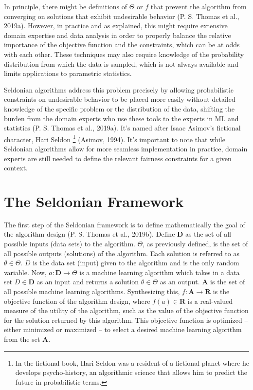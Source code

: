 \documentclass[12pt, twoside]{amherstthesis}
\begin{document}
In principle, there might be definitions of \(\Theta\) or \(f\) that prevent the algorithm from converging on solutions that exhibit undesirable behavior (P. S. Thomas et al., 2019a). However, in practice and as explained, this might require extensive domain expertise and data analysis in order to properly balance the relative importance of the objective function and the constraints, which can be at odds with each other. These techniques may also require knowledge of the probability distribution from which the data is sampled, which is not always available and limits applications to parametric statistics.

Seldonian algorithms address this problem precisely by allowing probabilistic constraints on undesirable behavior to be placed more easily without detailed knowledge of the specific problem or the distribution of the data, shifting the burden from the domain experts who use these tools to the experts in ML and statistics (P. S. Thomas et al., 2019a). It's named after Isaac Asimov's fictional character, Hari Seldon \footnote{In the fictional book, Hari Seldon was a resident of a fictional planet where he develops psycho-history, an algorithmic science that allows him to predict the future in probabilistic terms.} (Asimov, 1994). It's important to note that while Seldonian algorithms allow for more seamless implementation in practice, domain experts are still needed to define the relevant fairness constraints for a given context.

\hypertarget{seldonian}{%
\section{The Seldonian Framework}\label{seldonian}}

The first step of the Seldonian framework is to define mathematically the goal of the algorithm design (P. S. Thomas et al., 2019b). Define \(\textbf{D}\) as the set of all possible inputs (data sets) to the algorithm. \(\Theta\), as previously defined, is the set of all possible outputs (solutions) of the algorithm. Each solution is referred to as \(\theta \in \Theta\). \(D\) is the data set (input) given to the algorithm and is the only random variable. Now, \(a: \textbf{D} \rightarrow \Theta\) is a machine learning algorithm which takes in a data set \(D \in \textbf{D}\) as an input and returns a solution \(\theta \in \Theta\) as an output. \(\textbf{A}\) is the set of all possible machine learning algorithms. Synthesizing this, \(f: \textbf{A} \rightarrow \textbf{R}\) is the objective function of the algorithm design, where \(f(a) \in \textbf{R}\) is a real-valued measure of the utility of the algorithm, such as the value of the objective function for the solution returned by this algorithm. This objective function is optimized -- either minimized or maximized -- to select a desired machine learning algorithm from the set \(\textbf{A}\).
\end{document}
